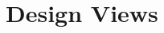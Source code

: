 \documentclass[titlepage]{article}
\begin{document}

\section{Design Views
    \label{design-views}
}
% 
% 
% 
% 
% 
% 
\end{document}
